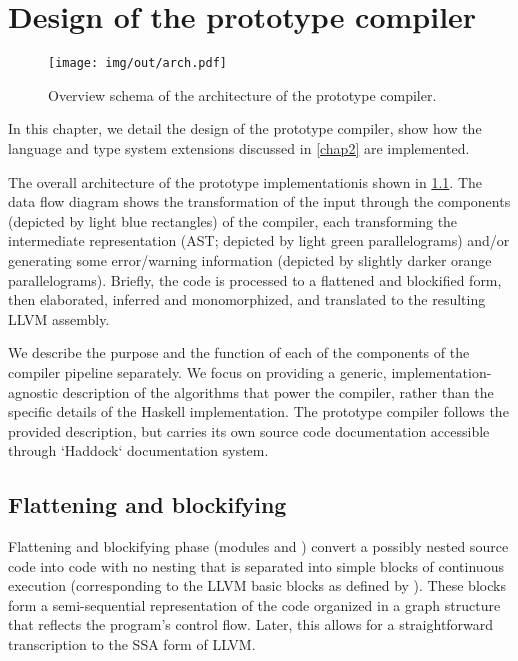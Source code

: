 \chapter{Design of the prototype compiler}

\label{chap3}

\begin{figure}
\caption{Overview schema of the architecture of the prototype compiler.}
\label{fig:arch}
    \texttt{[image: img/out/arch.pdf]}
\end{figure}

In this chapter, we detail the design of the prototype compiler, show how the language and type system extensions discussed in \cref{chap2} are implemented.

The overall architecture of the prototype implementation\cmmrepo is shown in \cref{fig:arch}. The data flow diagram shows the transformation of the input through the components (depicted by light blue rectangles) of the compiler, each transforming the intermediate representation (AST; depicted by light green parallelograms) and/or generating some error/warning information (depicted by slightly darker orange parallelograms). Briefly, the code is processed to a flattened and blockified form, then elaborated, inferred and monomorphized, and translated to the resulting LLVM assembly.

We describe the purpose and the function of each of the components of the compiler pipeline separately. We focus on providing a generic, implementation-agnostic description of the algorithms that power the compiler, rather than the specific details of the Haskell implementation. The prototype compiler follows the provided description, but carries its own source code documentation accessible through `Haddock` documentation system.

\section{Flattening and blockifying}
\label{sec:flatBlock}

\sloppy Flattening and blockifying phase (modules  and ) convert a possibly nested \cmm source code into code with no nesting that is separated into simple blocks of continuous execution (corresponding to the LLVM basic blocks as defined by \cite{llvmBB}). These blocks form a semi-sequential representation of the code organized in a graph structure that reflects the program's control flow. Later, this allows for a straightforward transcription to the SSA form of LLVM.

